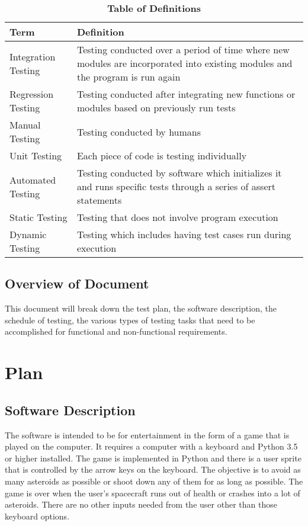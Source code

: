 \documentclass[12pt, titlepage]{article}
\begin{document}
\begin{table}[H]
\caption{\textbf{Table of Definitions}} \label{Table}

\begin{tabularx}{\textwidth}{p{4cm}X}
\toprule
\textbf{Term} & \textbf{Definition}\\
\midrule
Integration Testing & Testing conducted over a period of time where new modules are incorporated into existing modules and the program is run again\\ \hline 
Regression Testing & Testing conducted after integrating new functions or modules based on previously run tests \\ \hline
Manual Testing & Testing conducted by humans \\ \hline
Unit Testing & Each piece of code is testing individually \\ \hline
Automated Testing & Testing conducted by software which initializes it and runs specific tests through a series of assert statements \\ \hline 
Static Testing & Testing that does not involve program execution  \\ \hline  
Dynamic Testing & Testing which includes having test cases run during execution\\
\bottomrule
\end{tabularx}

\end{table}    

\subsection{Overview of Document}
This document will break down the test plan, the software description, the schedule of testing, the various types of testing tasks that need to be accomplished for functional and non-functional requirements. 

\newpage

\section{Plan}
    
\subsection{Software Description}
The software is intended to be for entertainment in the form of a game that is played on the computer. It requires a computer with a keyboard and Python 3.5 or higher installed. The game is implemented in Python and there is a user sprite that is controlled by the arrow keys on the keyboard. The objective is to avoid as many asteroids as possible or shoot down any of them for as long as possible. The game is over when the user's spacecraft runs out of health or crashes into a lot of asteroids. There are no other inputs needed from the user other than those keyboard options. 
\end{document}
